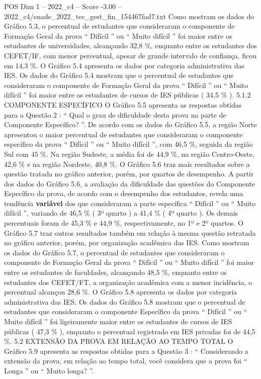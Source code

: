 \begin{textsample}{POS Dim 1 – 2022\_c4 – Score -3.00 – 2022\_c4/enade\_2022\_tec\_gest\_fin\_154467fad7.txt}
Como mostram os dados do Gráfico 5.3, o percentual de estudantes que consideraram o componente de Formação Geral da prova “ Difícil ” ou “ Muito difícil ” foi maior entre os estudantes de universidades, alcançando 32,8 \%, enquanto entre os estudantes dos CEFET/IF, com menor percentual, apesar de grande intervalo de confiança, ficou em 14,3 \%.
O Gráfico 5.4 apresenta os dados por categoria administrativa das IES.
Os dados do Gráfico 5.4 mostram que o percentual de estudantes que consideraram o componente de Formação Geral da prova “ Difícil ” ou “ Muito difícil ” foi maior entre os estudantes de cursos de IES públicas ( 34,5 \% ). 5.1.2 COMPONENTE ESPECÍFICO O Gráfico 5.5 apresenta as respostas obtidas para a Questão 2 : “ Qual o grau de dificuldade desta prova na parte de Componente Específico? ”.
De acordo com os dados do Gráfico 5.5, a região Norte apresentou o maior percentual de estudantes que consideraram o componente específico da prova “ Difícil ” ou “ Muito difícil ”, com 46,5 \%, seguida da região Sul com 45 \%.
Na região Sudeste, a média foi de 44,9 \%, na região Centro-Oeste, 42,6 \% e na região Nordeste, 40,8 \%.
O Gráfico 5.6 traz mais resultados sobre a questão tratada no gráfico anterior, porém, por quartos de desempenho.
A partir dos dados do Gráfico 5.6, a avaliação da dificuldade das questões do Componente Específico da prova, de acordo com o desempenho dos estudantes, revela uma tendência \textbf{variável} dos que consideraram a parte específica “ Difícil ” ou “ Muito difícil ”, variando de 46,5 \% ( 3º quarto ) a 41,4 \% ( 4º quarto ).
Os demais percentuais foram de 45,3 \% e 44,9 \%, respectivamente, no 1º e 2º quartos.
O Gráfico 5.7 traz outros resultados também em relação à mesma questão retratada no gráfico anterior, porém, por organização acadêmica das IES.
Como mostram os dados do Gráfico 5.7, o percentual de estudantes que consideraram o componente de Formação Geral da prova “ Difícil ” ou “ Muito difícil ” foi maior entre os estudantes de faculdades, alcançando 48,5 \%, enquanto entre os estudantes dos CEFET/FT, a organização acadêmica com a menor incidência, o percentual alcançou 28,6 \%.
O Gráfico 5.8 apresenta os dados por categoria administrativa das IES.
Os dados do Gráfico 5.8 mostram que o percentual de estudantes que consideraram o componente Específico da prova “ Difícil ” ou “ Muito difícil ” foi ligeiramente maior entre os estudantes de cursos de IES públicas ( 47,3 \% ), enquanto o percentual registrado em IES privadas foi de 44,5 \%. 5.2 EXTENSÃO DA PROVA EM RELAÇÃO AO TEMPO TOTAL O Gráfico 5.9 apresenta as respostas obtidas para a Questão 3 : “ Considerando a extensão da prova, em relação ao tempo total, você considera que a prova foi “ Longa ” ou “ Muito longa? ”.

\end{textsample}
